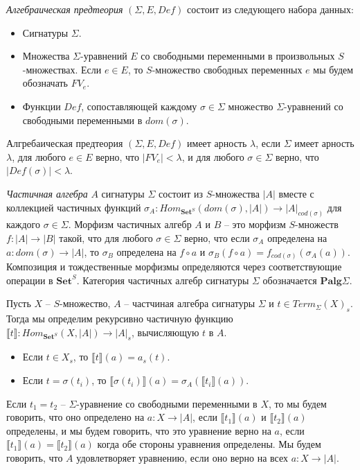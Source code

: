 \documentclass{amsart}
\theoremstyle{definition}
\theoremstyle{remark}
\renewcommand{\ll}{\llbracket}
\newcommand{\rr}{\rrbracket}
\newcommand{\cat}[1]{\mathbf{#1}}
\newcommand{\Set}{\cat{Set}}
\numberwithin{figure}{section}
\begin{document}
\begin{defn}
\emph{Алгебраическая предтеория} $(\Sigma, E, Def)$ состоит из следующего набора данных:
\begin{itemize}
\item Сигнатуры $\Sigma$.
\item Множества $\Sigma$-уравнений $E$ со свободными переменными в произвольных $S$-множествах.
    Если $e \in E$, то $S$-множество свободных переменных $e$ мы будем обозначать $FV_e$.
\item Функции $Def$, сопоставляющей каждому $\sigma \in \Sigma$ множество $\Sigma$-уравнений со свободными переменными в $dom(\sigma)$.
\end{itemize}
\end{defn}
Алгребаическая предтеория $(\Sigma, E, Def)$ имеет арность $\lambda$, если $\Sigma$ имеет арность $\lambda$, для любого $e \in E$ верно, что $|FV_e| < \lambda$, и для любого $\sigma \in \Sigma$ верно, что $|Def(\sigma)| < \lambda$.

\emph{Частичная алгебра} $A$ сигнатуры $\Sigma$ состоит из $S$-множества $|A|$ вместе с коллекцией частичных функций $\sigma_A : Hom_{\Set^S}(dom(\sigma), |A|) \to |A|_{cod(\sigma)}$ для каждого $\sigma \in \Sigma$.
Морфизм частичных алгебр $A$ и $B$ -- это морфизм $S$-множеств $f : |A| \to |B|$ такой, что для любого $\sigma \in \Sigma$ верно, что если $\sigma_A$ определена на $a : dom(\sigma) \to |A|$, то $\sigma_B$ определена на $f \circ a$ и $\sigma_B(f \circ a) = f_{cod(\sigma)}(\sigma_A(a))$.
Композиция и тождественные морфизмы определяются через соответствующие операции в $\Set^S$.
Категория частичных алгебр сигнатуры $\Sigma$ обозначается $\cat{Palg}\Sigma$.

Пусть $X$ -- $S$-множество, $A$ -- частчиная алгебра сигнатуры $\Sigma$ и $t \in Term_\Sigma(X)_s$.
Тогда мы определим рекурсивно частичную функцию $\ll t \rr : Hom_{\Set^S}(X, |A|) \to |A|_s$, вычисляющую $t$ в $A$.
\begin{itemize}
\item Если $t \in X_s$, то $\ll t \rr(a) = a_s(t)$.
\item Если $t = \sigma(t_i)$, то $\ll \sigma(t_i) \rr(a) = \sigma_A(\ll t_i \rr(a))$.
\end{itemize}
Если $t_1 = t_2$ -- $\Sigma$-уравнение со свободными переменными в $X$, то мы будем говорить, что оно определено на $a : X \to |A|$, если $\ll t_1 \rr(a)$ и $\ll t_2 \rr(a)$ определены, и мы будем говорить, что это уравнение верно на $a$, если $\ll t_1 \rr(a) = \ll t_2 \rr(a)$ когда обе стороны уравнения определены.
Мы будем говорить, что $A$ удовлетворяет уравнению, если оно верно на всех $a : X \to |A|$.
\end{document}
